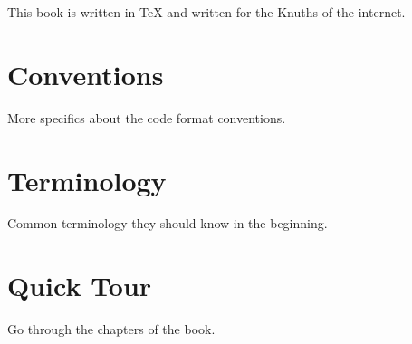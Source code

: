 This book is written in TeX and written for the Knuths of the internet.

\section*{Conventions}

More specifics about the code format conventions.

\section*{Terminology}

Common terminology they should know in the beginning.

\section*{Quick Tour}

Go through the chapters of the book.

